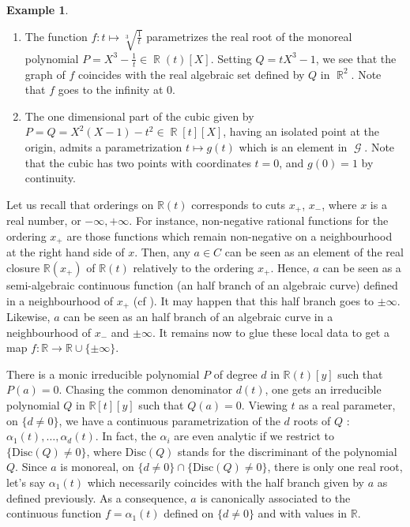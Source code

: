 \documentclass[12pt]{amsart}
\theoremstyle{definition}
\newtheorem{ex}[thm]{Example}
\DeclareMathOperator{\R}{\mathbb R}
\def \RR {{\mathbb R}}
\DeclareMathOperator{\GM}{\mathcal{G}}
\begin{document}
\begin{ex}\begin{enumerate}
\item 
The function $f:t\mapsto\sqrt[3]{\frac{1}{t}}$ parametrizes the real root of the monoreal polynomial $P=X^3-\frac{1}{t}\in \R(t)[X]$. Setting $Q=tX^3-1$, we see that the graph of $f$ coincides with the real algebraic set defined by $Q$ in $\R^2$. Note that $f$ goes to the infinity at $0$.

\item The one dimensional part of the cubic given by $P=Q=X^2(X-1)-t^2\in \R[t][X]$, having an isolated point at the origin, admits a parametrization $t\mapsto g(t)$ which is an element in $\GM$. Note that the cubic has two points with coordinates $t=0$, and $g(0)=1$ by continuity.
\end{enumerate}
\end{ex}


Let us recall that orderings on $\RR(t)$ corresponds to cuts $x_+$, $x_-$, where $x$ is a real number, or $-\infty,+\infty$. For instance, non-negative rational functions for the ordering $x_+$ are those functions which remain non-negative on a neighbourhood at the right hand side of $x$.  
Then, any $a\in C$ can be seen as an element of the real closure $\RR(x_+)$ of $\RR(t)$ relatively to the ordering $x_+$. 
Hence, $a$ can be seen as a semi-algebraic continuous function (an half branch of an algebraic curve) defined in a neighbourhood of $x_+$ (cf \cite[8.1.12]{BCR}).
It may happen that this half branch goes to $\pm\infty$.
Likewise, $a$ can be seen as an half branch of an algebraic curve in a neighbourhood of $x_-$ and $\pm \infty$.
It remains now to glue these local data to get a map $f:\RR\to \RR\cup\{\pm\infty\}$.

There is a monic irreducible polynomial $P$ of degree $d$  in $\RR(t)[y]$ such that $P(a)=0$.
Chasing the common denominator $d(t)$, one gets an irreducible polynomial $Q$ in 
$\RR[t][y]$ such that $Q(a)=0$.
Viewing $t$ as a real parameter, 
on $\{ d\not=0\}$, we have a continuous parametrization of the $d$ roots of $Q$ : $\alpha_1(t),\ldots,\alpha_d(t)$.
In fact, the $\alpha_i$ are even analytic if we restrict to $\{\textrm{Disc}(Q)\not=0\}$, where $\textrm{Disc}(Q)$ stands for the discriminant of the polynomial $Q$.
Since $a$ is monoreal, on $\{ d\not=0\}\cap\{\textrm{Disc}(Q)\not=0\}$, there is only one real root, let's say $\alpha_1(t)$ which necessarily coincides with the half branch given by $a$ as defined previously. As a consequence, $a$ is canonically associated to the continuous function $f=\alpha_1(t)$ defined on $\{ d\not=0\}$ and with values in $\RR$. 
\end{document}

